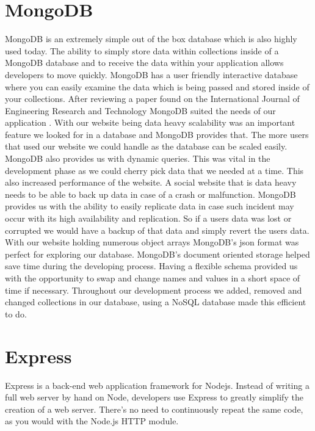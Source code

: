 \section{MongoDB}
MongoDB is an extremely simple out of the box database which is also highly used today. The ability to simply store data within collections inside of a MongoDB database and to receive the data within your application allows developers to move quickly. MongoDB has a user friendly interactive database where you can easily examine the data which is being passed and stored inside of your collections.
After reviewing a paper found on the International Journal of Engineering Research and Technology MongoDB suited the needs of our application \cite{chauhan2019review}. With our website being data heavy scalability was an important feature we looked for in a database and MongoDB provides that. The more users that used our website we could handle as the database can be scaled easily. MongoDB also provides us with dynamic queries. This was vital in the development phase as we could cherry pick data that we needed at a time. This also increased performance of the website. A social website that is data heavy needs to be able to back up data in case of a crash or malfunction. MongoDB provides us with the ability to easily replicate data in case such incident may occur with its high availability and replication. So if a users data was lost or corrupted we would have a backup of that data and simply revert the users data.
With our website holding numerous object arrays MongoDB's json format was perfect for exploring our database. MongoDB's document oriented storage helped save time during the developing process\cite{MongoDB}.
Having a flexible schema provided us with the opportunity to swap and change names and values in a short space of time if necessary. Throughout our development process we added, removed and changed collections in our database, using a NoSQL database made this efficient to do.

\section{Express}
Express is a back-end web application framework for Nodejs. Instead of writing a full web server by hand on Node, developers use Express to greatly simplify the creation of a web server. There’s no need to continuously repeat the same code, as you would with the Node.js HTTP module.

